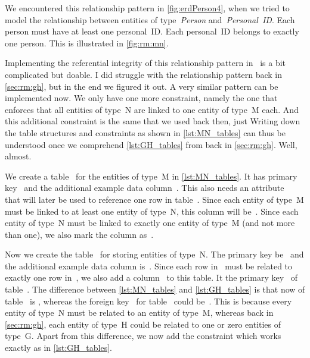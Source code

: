 We encountered this relationship pattern in \cref{fig:erdPerson4}, when we tried to model the relationship between entities of type~\emph{Person} and~\emph{Personal~ID}.
Each person must have at least one personal~ID.
Each personal~ID belongs to exactly one person.
This is illustrated in \cref{fig:rm:mn}.

Implementing the referential integrity of this relationship pattern in \sql\ is a bit complicated but doable.
I did struggle with the  relationship pattern back in \cref{sec:rm:gh}, but in the end we figured it out.
A very similar pattern can be implemented now.
We only have one more constraint, namely the one that enforces that all entities of type~N are linked to one entity of type~M each.
And this additional constraint is the same that we used back then, just 
Writing down the table structures and constraints as shown in \cref{lst:MN_tables} can thus be understood once we comprehend \cref{lst:GH_tables} from back in \cref{sec:rm:gh}.
Well, almost.

We create a table~ for the entities of type~M in \cref{lst:MN_tables}.
It has primary key~ and the additional example data column~.
This also needs an attribute~ that will later be used to reference one row in table~.
Since each entity of type~M must be linked to at least one entity of type~N, this column will be~.
Since each entity of type~N must be linked to exactly one entity of type~M (and not more than one), we also mark the column as~.

Now we create the table~ for storing entities of type~N.
The primary key be~ and the additional example data column is~.
Since each row in~ must be related to exactly one row in~, we also add a column~ to this table.
It  the primary key~ of table~.
The difference between \cref{lst:MN_tables} and \cref{lst:GH_tables} is that now  of table~ is , whereas the foreign key~ for table~ could be~.
This is because every entity of type~N must be related to an entity of type~M, whereas back in \cref{sec:rm:gh}, each entity of type~H could be related to one or zero entities of type~G.
Apart from this difference, we now add the constraint  which works exactly as  in \cref{lst:GH_tables}.

